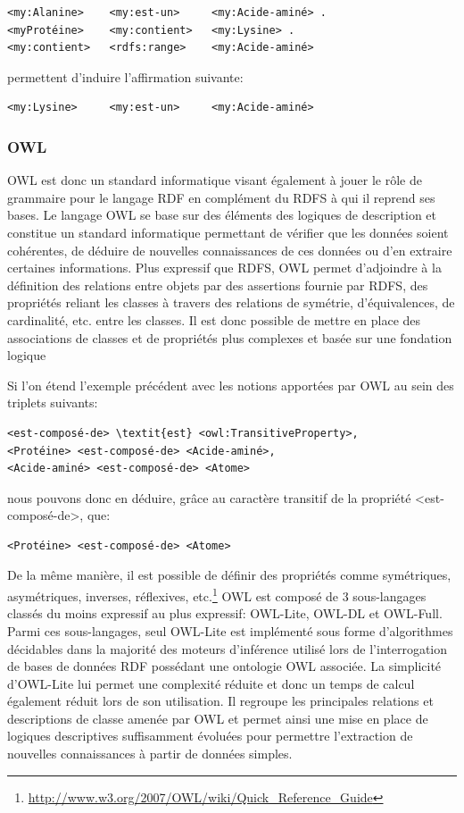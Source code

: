 \begin{lstlisting}
<my:Alanine>	<my:est-un>		<my:Acide-aminé> .
<myProtéine>	<my:contient>	<my:Lysine> .
<my:contient>	<rdfs:range>	<my:Acide-aminé> 
\end{lstlisting}

permettent d'induire l'affirmation suivante:

\begin{lstlisting}
<my:Lysine>		<my:est-un>		<my:Acide-aminé>
\end{lstlisting}

\subsubsection{OWL} \label{owl}

OWL est donc un standard informatique visant également à jouer le rôle de grammaire pour le langage RDF en complément du RDFS à qui il reprend ses bases. Le langage OWL se base sur des éléments des logiques de description et constitue un standard informatique permettant de vérifier que les données soient cohérentes, de déduire de nouvelles connaissances de ces données ou d'en extraire certaines informations.
Plus expressif que RDFS, OWL permet d'adjoindre à la définition des relations entre objets par des assertions fournie par RDFS, des propriétés reliant les classes à travers des relations de symétrie, d'équivalences, de cardinalité, etc. entre les classes. 
Il est donc possible de mettre en place des associations de classes et de propriétés plus complexes et basée sur une fondation logique  

Si l'on étend l'exemple précédent avec les notions apportées par OWL au sein des triplets suivants:

\begin{lstlisting}
<est-composé-de> \textit{est} <owl:TransitiveProperty>,
<Protéine> <est-composé-de> <Acide-aminé>,
<Acide-aminé> <est-composé-de> <Atome>
\end{lstlisting}

nous pouvons donc en déduire, grâce au caractère transitif de la propriété <est-composé-de>, que:

\begin{lstlisting}
<Protéine> <est-composé-de> <Atome>
\end{lstlisting}

De la même manière, il est possible de définir des propriétés comme symétriques, asymétriques, inverses, réflexives, etc.\footnote{\url{http://www.w3.org/2007/OWL/wiki/Quick_Reference_Guide}}
OWL est composé de 3 sous-langages classés du moins expressif au plus expressif: OWL-Lite, OWL-DL et OWL-Full. Parmi ces sous-langages, seul OWL-Lite est implémenté sous forme d'algorithmes décidables dans la majorité des moteurs d'inférence utilisé lors de l'interrogation de bases de données RDF possédant une ontologie OWL associée. La simplicité d'OWL-Lite lui permet une complexité réduite et donc un temps de calcul également réduit lors de son utilisation. Il regroupe les principales relations et descriptions de classe amenée par OWL et permet ainsi une mise en place de logiques descriptives suffisamment évoluées pour permettre l'extraction de nouvelles connaissances à partir de données simples.

